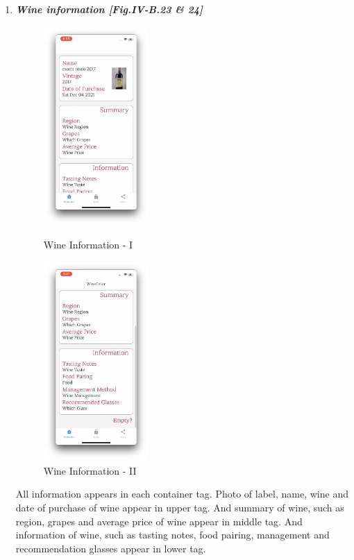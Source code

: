 \documentclass[conference]{IEEEtran}
\numberwithin{figure}{subsection}
\begin{document}
\begin{enumerate}
\begin{enumerate}
        \item \textit{\textbf{Wine information [Fig.IV-B.23 \& 24]}}\\
        \begin{figure}[htb!]
             \centerline{\includegraphics[width=4cm]{wineinfo.png}}
             \caption{Wine Information - I}
             \centerline{\includegraphics[width=4cm]{wineinfo2.png}}
             \caption{Wine Information - II}
         \end{figure}
        All information appears in each container tag. Photo of label, name, wine and date of purchase of wine appear in upper tag. And summary of wine, such as region, grapes and average price of wine appear in middle tag. And information of wine, such as tasting notes, food pairing, management and recommendation glasses appear in lower tag.
    \end{enumerate}
    

\end{enumerate}
\end{document}
